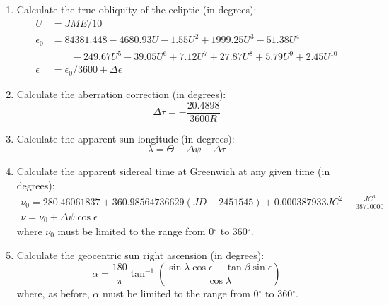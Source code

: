 {\begin{enumerate}
\begin{enumerate}
      \item Calculate the nutation in longitude and obliquity (in degrees):
	\begin{gather*}
	  \Delta \psi = \frac{\sum \limits_{i=0}^{63} \Delta \psi_i}{36000000} \\
	  \Delta \epsilon = \frac{\sum \limits_{i=0}^{63} \Delta \epsilon_i}{36000000}
	\end{gather*}
  \end{enumerate}

\item Calculate the true obliquity of the ecliptic (in degrees):
\begin{align*}
U &= JME / 10 \\
\epsilon_0 &= 84381.448 - 4680.93 U - 1.55 U^2 + 1999.25 U^3 - 51.38 U^4 \\
           & \qquad {} - 249.67 U^5 - 39.05 U^6 + 7.12 U^7 + 27.87 U^8 + 5.79 U^9 + 2.45 U^{10} \\
\epsilon &= \epsilon_0 / 3600 + \Delta \epsilon
\end{align*}

\item Calculate the aberration correction (in degrees):
\begin{displaymath}
\Delta \tau = - \frac{20.4898}{3600 R}
\end{displaymath}

\item Calculate the apparent sun longitude (in degrees):
\begin{displaymath}
\lambda = \Theta + \Delta \psi + \Delta \tau
\end{displaymath}

\item Calculate the apparent sidereal time at Greenwich at any given time (in degrees):
\begin{gather*}
\nu_0 = 280.46061837 + 360.98564736629 (JD - 2451545) + 0.000387933 JC^2 - \frac{JC^3}{38710000} \\
\nu = \nu_0 + \Delta \psi \cos{\epsilon}
\end{gather*}
where $\nu_0$ must be limited to the range from 0$^\circ$ to 360$^\circ$.

\item Calculate the geocentric sun right ascension (in degrees):
\begin{displaymath}
\alpha = \frac{180}{\pi} \tan^{-1}{\left(\frac{\sin{\lambda} \cos{\epsilon} - \tan{\beta} \sin{\epsilon}}{\cos{\lambda}}\right)}
\end{displaymath}
where, as before, $\alpha$ must be limited to the range from 0$^\circ$ to 360$^\circ$.


\end{enumerate}}
